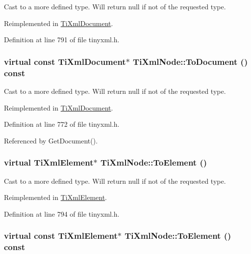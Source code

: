 Cast to a more defined type. Will return null if not of the requested type. 

Reimplemented in \hyperlink{class_ti_xml_document_a1025d942a1f328fd742d545e37efdd42}{TiXmlDocument}.

Definition at line 791 of file tinyxml.h.\hypertarget{class_ti_xml_node_a8a4cda4b15c29f64cff419309aebed08}{
\subsubsection[{ToDocument}]{\setlength{\rightskip}{0pt plus 5cm}virtual const {\bf TiXmlDocument}$\ast$ TiXmlNode::ToDocument () const}}
\label{class_ti_xml_node_a8a4cda4b15c29f64cff419309aebed08}


Cast to a more defined type. Will return null if not of the requested type. 

Reimplemented in \hyperlink{class_ti_xml_document_a1dc977bde3e4fe85a8eb9d88a35ef5a4}{TiXmlDocument}.

Definition at line 772 of file tinyxml.h.

Referenced by GetDocument().\hypertarget{class_ti_xml_node_aa65d000223187d22a4dcebd7479e9ebc}{
\subsubsection[{ToElement}]{\setlength{\rightskip}{0pt plus 5cm}virtual {\bf TiXmlElement}$\ast$ TiXmlNode::ToElement ()}}
\label{class_ti_xml_node_aa65d000223187d22a4dcebd7479e9ebc}


Cast to a more defined type. Will return null if not of the requested type. 

Reimplemented in \hyperlink{class_ti_xml_element_a9def86337ea7a755eb41cac980f60c7a}{TiXmlElement}.

Definition at line 794 of file tinyxml.h.\hypertarget{class_ti_xml_node_a72abed96dc9667ab9e0a2a275301bb1c}{
\subsubsection[{ToElement}]{\setlength{\rightskip}{0pt plus 5cm}virtual const {\bf TiXmlElement}$\ast$ TiXmlNode::ToElement () const}}
\label{class_ti_xml_node_a72abed96dc9667ab9e0a2a275301bb1c}



